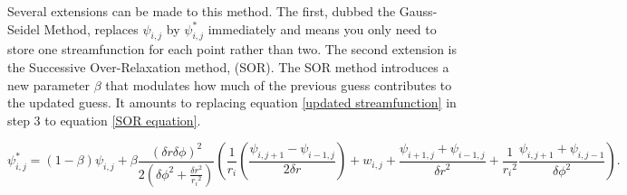 \documentclass{article}
\begin{document}
Several extensions can be made to this method. The first, dubbed the Gauss-Seidel Method, replaces $\psi_{i,j}$ by $\psi_{i,j}^{*}$ immediately and means you only need to store one streamfunction for each point rather than two. The second extension is the Successive Over-Relaxation method, (SOR). The SOR method introduces a new parameter $\beta$ that modulates how much of the previous guess contributes to the updated guess. It amounts to replacing equation \ref{updated streamfunction} in step 3 to equation \ref{SOR equation}.

\begin{equation}
	\psi_{i,j}^{*} = (1- \beta)\psi_{i,j} +  \beta \frac{(\delta r \delta \phi)^2}{2 ( {\delta \phi}^2 + \frac{ {\delta r}^2}{{r_i}^2})} ( \frac{1}{r_i} (\frac{\psi_{i,j+1}-\psi_{i-1,j}}{2 \delta r}) +w_{i,j} + \frac{\psi_{i+1,j} + \psi_{i-1,j}}{ {\delta r}^2 } + \frac{1}{ {r_i}^2 } \frac{\psi_{i,j+1} + \psi_{i,j-1}}{ {\delta \phi}^2 }  ).
	\label{SOR equation}
\end{equation}
\end{document}
